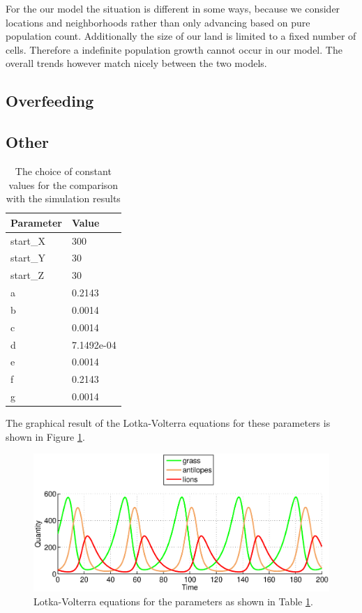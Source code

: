 \documentclass[11pt]{article}
\begin{document}
For the our model the situation is different in some ways, because we consider locations and neighborhoods rather than only advancing based on pure population count. Additionally the size of our land is limited to a fixed number of cells. Therefore a indefinite population growth cannot occur in our model. The overall trends however match nicely between the two models.

\subsection{Overfeeding}

\subsection{Other}

\begin{table}[htbp]
\centering
\begin{tabular}{l|l}
Parameter & Value \\ 
\hline 
\hline
start\_X & 300\\
\hline
start\_Y & 30\\
\hline
start\_Z & 30\\
\hline
a & 0.2143\\ 
\hline 
b & 0.0014\\ 
\hline 
c & 0.0014\\  
\hline 
d & 7.1492e-04\\
\hline 
e & 0.0014\\
\hline 
f & 0.2143\\
\hline 
g & 0.0014\\
\end{tabular}
\caption{The choice of constant values for the comparison with the simulation results}
\label{tab:LotkaVolterraParametersFinal}
\end{table}

The graphical result of the Lotka-Volterra equations for these parameters is shown in Figure \ref{fig:LotkaVolterraThreeAdjusted}.

\begin{figure}
\centering
\includegraphics[scale=0.7]{LotkaVolterraThreeAdjusted}
\caption{Lotka-Volterra equations for the parameters as shown in Table \ref{tab:LotkaVolterraParametersFinal}.}
\label{fig:LotkaVolterraThreeAdjusted}
\end{figure}
\end{document}
